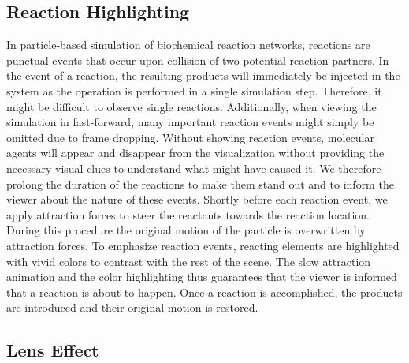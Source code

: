 
\subsection{Reaction Highlighting}

In particle-based simulation of biochemical reaction networks, reactions are punctual events that occur upon collision of two potential reaction partners.
In the event of a reaction, the resulting products will immediately be injected in the system as the operation is performed in a single simulation step.
Therefore, it might be difficult to observe single reactions.
Additionally, when viewing the simulation in fast-forward, many important reaction events might simply be omitted due to frame dropping.
Without showing reaction events, molecular agents will appear and disappear from the visualization without providing the necessary visual clues to understand what might have caused it.
We therefore prolong the duration of the reactions to make them stand out and to inform the viewer about the nature of these events.
Shortly before each reaction event, we apply attraction forces to steer the reactants towards the reaction location. 
During this procedure the original motion of the particle is overwritten by attraction forces.
To emphasize reaction events, reacting elements are highlighted with vivid colors to contrast with the rest of the scene.
The slow attraction animation and the color highlighting thus guarantees that the viewer is informed that a reaction is about to happen.
Once a reaction is accomplished, the products are introduced and their original motion is restored.



\subsection{Lens Effect}

